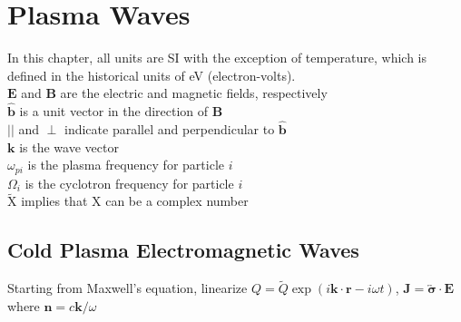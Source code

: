 \chapter{Plasma Waves}
\label{chap:plasmawaves}
In this chapter, all units are SI with the exception of temperature,
which is defined in the historical units of eV (electron-volts).\\

\noindent
$\mathbf{E}$ and $\mathbf{B}$ are the electric and magnetic fields, respectively\\
$\hat{\textbf{b}}$ is a unit vector in the direction of $\textbf{B}$\\
$||$ and $\perp$ indicate parallel and perpendicular to $\hat{\textbf{b}}$\\
$\mathbf{k}$ is the wave vector\\ 
$\omega_{pi}$ is the plasma frequency for particle $i$ \\
$\Omega_i$ is the cyclotron frequency for particle $i$\\
$\tilde{\mathrm{X}}$ implies that X can be a complex number

\section{Cold Plasma Electromagnetic Waves}
\noindent
Starting from Maxwell's equation, linearize $Q =
\widetilde{Q}\exp(i\textbf{k}\cdot\textbf{r} - i \omega t)$,
$\textbf{J} = \overleftrightarrow{\boldsymbol{\sigma}} \cdot \textbf{E}$ 
\indent where $\textbf{n} = c \textbf{k}/\omega$\\

